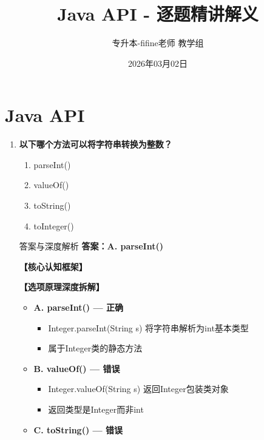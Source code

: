 \documentclass[12pt, a4paper]{ctexart}
\title{\textcolor{myblue}{\textbf{Java API - 逐题精讲解义}}}
\author{专升本-fifine老师 教学组}
\date{2026年03月02日}
\begin{document}
\maketitle
\thispagestyle{empty}
\newpage

\section{Java API}

\begin{enumerate}[label=\textbf{\arabic*.}]

	\item \textbf{以下哪个方法可以将字符串转换为整数？}
	      \begin{enumerate}[label=\Alph*.]
		      \item parseInt()
		      \item valueOf()
		      \item toString()
		      \item toInteger()
	      \end{enumerate}

	      \begin{bluebox}{答案与深度解析}
		      \textbf{答案：A. parseInt()}

		      \textbf{【核心认知框架】}

		      \textbf{【选项原理深度拆解】}
					  \begin{itemize}[label={}, leftmargin=*, nosep]


		      \item \textbf{A. parseInt() — 正确}
					  \begin{itemize}[label={}, nosep]
		      
			      \item Integer.parseInt(String s) 将字符串解析为int基本类型
			      \item 属于Integer类的静态方法

					  \end{itemize}
		      \item \textbf{B. valueOf() — 错误}
					  \begin{itemize}[label={}, nosep]
		      
			      \item Integer.valueOf(String s) 返回Integer包装类对象
			      \item 返回类型是Integer而非int
		      

					  \end{itemize}
		      \item \textbf{C. toString() — 错误}
					  \begin{itemize}[label={}, nosep]
		      

\end{itemize}
\end{itemize}
\end{bluebox}
\end{enumerate}
\end{document}
